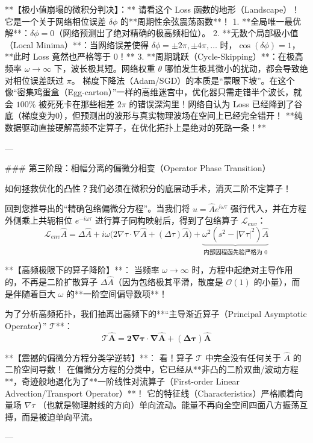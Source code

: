 \documentclass[12pt]{article}
\begin{document}
{**【极小值崩塌的微积分判决】：**
请看这个 Loss 函数的地形（Landscape）！它是一个关于网络相位误差 $\delta \phi$ 的**周期性余弦震荡函数**！
1. **全局唯一最优解**：$\delta \phi = 0$（网络预测出了绝对精确的极高频相位）。
2. **无数个局部极小值（Local Minima）**：当网络误差使得 $\delta \phi = \pm 2\pi, \pm 4\pi, \dots$ 时，$\cos(\delta \phi) = 1$，**此时 Loss 竟然也严格等于 0！**
3. **周期跳跃（Cycle-Skipping）**：在极高频率 $\omega \to \infty$ 下，波长极其短。网络权重 $\theta$ 哪怕发生极其微小的扰动，都会导致绝对相位误差跃过 $\pi$。
   梯度下降法（Adam/SGD）的本质是“蒙眼下坡”。在这个像“密集鸡蛋盒（Egg-carton）”一样的高维迷宫中，优化器只需走错半个波长，就会 $100\%$ 被死死卡在那些相差 $2\pi$ 的错误深沟里！网络自认为 Loss 已经降到了谷底（梯度变为0），但预测出的波形与真实物理波场在空间上已经完全错开！
   **纯数据驱动直接硬解高频不定算子，在优化拓扑上是绝对的死路一条！**

---

### 第三阶段：相幅分离的偏微分相变（Operator Phase Transition）

如何拯救优化的凸性？我们必须在微积分的底层动手术，消灭二阶不定算子！

回到您推导出的“精确包络偏微分方程”。当我们将 $u = \hat{A} e^{i\omega\tau}$ 强行代入，并在方程外侧乘上共轭相位 $e^{-i\omega\tau}$ 进行算子同构映射后，得到了包络算子 $\mathcal{L}_{env}$：
$$ \mathcal{L}_{env} \hat{A} = \Delta \hat{A} + i \omega \big( 2 \nabla \tau \cdot \nabla \hat{A} + (\Delta \tau) \hat{A} \big) + \underbrace{\omega^2 (s^2 - |\nabla \tau|^2) \hat{A}}_{\text{内部因程函先验严格为 0}} $$

**【高频极限下的算子降阶】**：
当频率 $\omega \to \infty$ 时，方程中起绝对主导作用的，不再是二阶扩散算子 $\Delta \hat{A}$（因为包络极其平滑，散度是 $\mathcal{O}(1)$ 的小量），而是伴随着巨大 $\omega$ 的**一阶空间偏导数项**！

为了分析高频拓扑，我们抽离出高频下的**“主导渐近算子（Principal Asymptotic Operator）” $\mathcal{T}$**：
$$ \mathbf{\mathcal{T} \hat{A} = 2 \nabla \tau \cdot \nabla \hat{A} + (\Delta \tau) \hat{A}} $$

**【震撼的偏微分方程分类学逆转】**：
看！算子 $\mathcal{T}$ 中完全没有任何关于 $\hat{A}$ 的二阶空间导数！
在偏微分方程的分类中，它已经从**非凸的二阶双曲/波动方程**，奇迹般地退化为了**一阶线性对流算子（First-order Linear Advection/Transport Operator）**！
它的特征线（Characteristics）严格顺着向量场 $\nabla \tau$ （也就是物理射线的方向）单向流动。能量不再向全空间四面八方振荡互搏，而是被迫单向平流。

---

}
\end{document}
